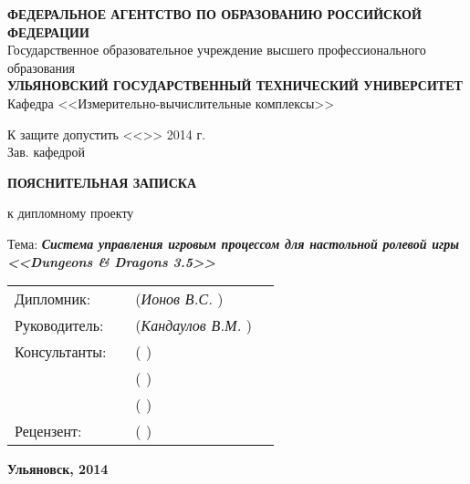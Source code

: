 \begin{titlepage}

\sffamily


\small
\begin{center}

\textbf{ФЕДЕРАЛЬНОЕ АГЕНТСТВО ПО ОБРАЗОВАНИЮ РОССИЙСКОЙ ФЕДЕРАЦИИ}\\
Государственное образовательное учреждение высшего профессионального образования\\
\textbf{УЛЬЯНОВСКИЙ ГОСУДАРСТВЕННЫЙ ТЕХНИЧЕСКИЙ УНИВЕРСИТЕТ}\\[0.7cm]

Кафедра <<Измерительно-вычислительные комплексы>>\\[0.7cm]

\begin{flushright}

К защите допустить <<\underline{\hspace{1cm}}>>\underline{\hspace{2.5cm}} 2014 г.\\
Зав. кафедрой \underline{\hspace{3.5cm}}

\end{flushright}

\vspace{1.5cm}

\LARGE

\textbf{ПОЯСНИТЕЛЬНАЯ ЗАПИСКА}

\Large

к дипломному проекту\\[0.7cm]

\normalsize

Тема: \textbf{\textit{\emph{Система управления игровым процессом для настольной ролевой игры <<Dungeons \& Dragons 3.5>>}}}

\vspace{2cm}

\begin{tabular}{l m{6cm} m{5cm} l}
    Дипломник:    & \emph{\hfill} & (\emph{Ионов В.С.\hfill}     )  & \\[0.5cm]
    Руководитель: & \emph{\hfill} & (\emph{Кандаулов В.М.\hfill} )  & \\[0.5cm]
    Консультанты: & \emph{\hfill} & (\emph{\hfill}               )  & \\[0.5cm]
                  & \emph{\hfill} & (\emph{\hfill}               )  & \\[0.5cm]
                  & \emph{\hfill} & (\emph{\hfill}               )  & \\[0.5cm]
    Рецензент:    & \emph{\hfill} & (\emph{\hfill}               )  & \\
\end{tabular}

\vfill

\textbf{Ульяновск, 2014}

\end{center}

\end{titlepage}

\restoregeometry
